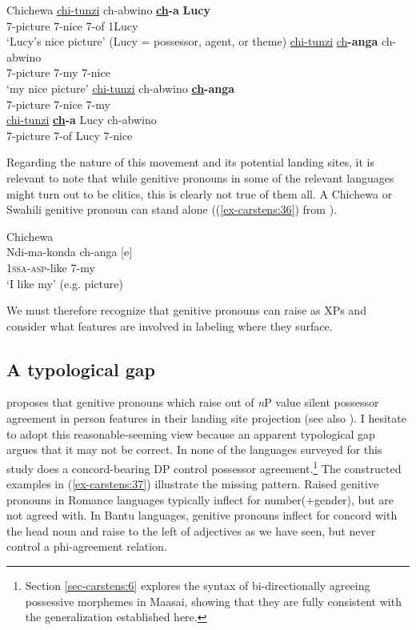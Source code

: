 \documentclass[output=paper
,modfonts
,nonflat]{langsci/langscibook}
\begin{document}
\begin{exe}
	\ex  Chichewa \label{ex-carstens:35}
	\xlist
	\ex
	\gll \underline{chi}\underline{-tunzi}     ch-abwino     \textbf{\underline{ch}-a}   \textbf{Lucy}\\
	7-picture   7-nice         7-of   1Lucy\\
	\glt `Lucy's nice picture'  (Lucy = possessor, agent, or theme) 	
	\ex 
	\gll \underline{chi}\underline{-tunzi}      \underline{ch}\textbf{-anga}     ch-abwino\\
	7-picture   7-my         7-nice\\
	\glt `my nice picture'
	\ex
	\gll  *\underline{chi}\underline{-tunzi}    ch-abwino     \textbf{\underline{ch}-anga}\\
	7-picture   7-nice      7-my\\
	\ex
	\gll  *\underline{chi}\underline{-tunzi}    \textbf{\underline{ch}-a} Lucy     ch-abwino\\
	7-picture   7-of   Lucy   7-nice\\
	\endxlist
\end{exe}
Regarding the nature of this movement and its potential landing sites, it is relevant to note that while genitive pronouns in some of the relevant languages might turn out to be clitics, this is clearly not true of them all. A Chichewa or Swahili genitive pronoun can stand alone ((\ref{ex-carstens:36}) from \citealt[295]{Carstens1997}).

\begin{exe}
\ex Chichewa\label{ex-carstens:36} \\
\gll Ndi-ma-konda  ch-anga [e]\\
1\textsc{ssa}-\textsc{asp}-like     7-my\\
\glt *`I like my' (e.g. picture)
\end{exe}
We must therefore recognize that genitive pronouns can raise as XPs and consider what features are involved in labeling where they surface. 

\subsection{A typological gap} \label{sec-carstens:5.2}
\citet{Giusti2008} proposes that genitive pronouns which raise out of \textit{n}P value silent possessor agreement in person features in their landing site projection (see also \citealt{Sichel2002}). I hesitate to adopt this reasonable-seeming view because an apparent typological gap argues that it may not be correct. In none of the languages surveyed for this study does a concord-bearing DP control possessor agreement.\footnote{Section \ref{sec-carstens:6} explores the syntax of bi-directionally agreeing possessive morphemes in Maasai, showing that they are fully consistent with the generalization established here.} The constructed examples in (\ref{ex-carstens:37}) illustrate the missing pattern. Raised genitive pronouns in Romance languages typically inflect for number(+gender), but are not agreed with. In Bantu languages, genitive pronouns inflect for concord with the head noun and raise to the left of adjectives as we have seen, but never control a phi-agreement relation. 
\end{document}
